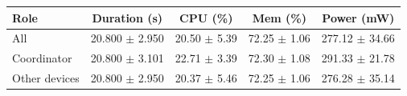 \begin{tabular}{lcccc}
\hline
\textbf{Role} & \textbf{Duration (s)} & \textbf{CPU (\%)} & \textbf{Mem (\%)} & \textbf{Power (mW)} \\
\hline
All & 20.800 $\pm$ 2.950 & 20.50 $\pm$ 5.39 & 72.25 $\pm$ 1.06 & 277.12 $\pm$ 34.66 \\
Coordinator & 20.800 $\pm$ 3.101 & 22.71 $\pm$ 3.39 & 72.30 $\pm$ 1.08 & 291.33 $\pm$ 21.78 \\
Other devices & 20.800 $\pm$ 2.950 & 20.37 $\pm$ 5.46 & 72.25 $\pm$ 1.06 & 276.28 $\pm$ 35.14 \\
\hline
\end{tabular}
